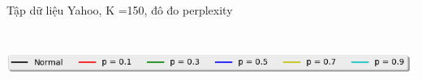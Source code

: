 \documentclass[pdf]{beamer}
\begin{document}
\begin{frame}{Tập dữ liệu Yahoo, K =150, đô đo perplexity}
\begin{columns}[T] %
\begin{column}{.50\textwidth}
\begin{figure}
\end{figure}
\end{column} %
\hfill%
\begin{column}{.50\textwidth}
\begin{figure}
\end{figure}				
\end{column} %
\end{columns}
\begin{center}
\includegraphics[width=1\textwidth]{menu.png}	
\end{center}
\end{frame}
\end{document}
